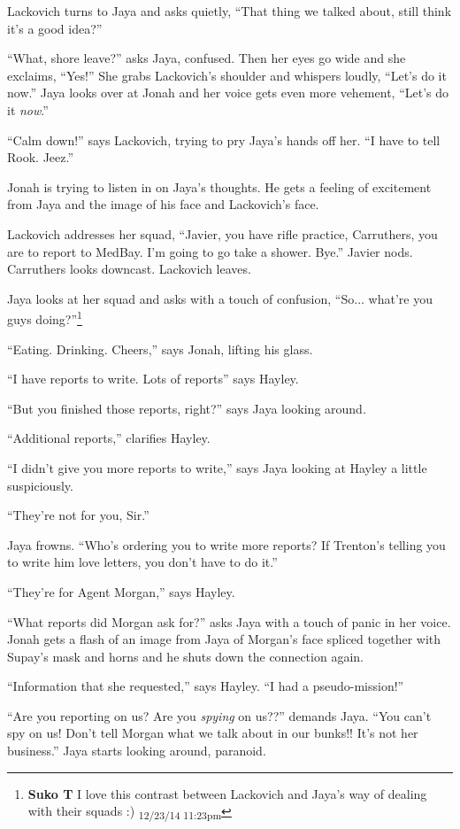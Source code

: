 Lackovich turns to Jaya and asks quietly, ``That thing we talked about, still think it's a good idea?''

``What, shore leave?'' asks Jaya, confused.  Then her eyes go wide and she exclaims, ``Yes!''  She grabs Lackovich's shoulder and whispers loudly, ``Let's do it now.''  Jaya looks over at Jonah and her voice gets even more vehement, ``Let's do it \textit{now}.''

``Calm down!'' says Lackovich, trying to pry Jaya's hands off her.  ``I have to tell Rook.  Jeez.''

Jonah is trying to listen in on Jaya's thoughts.  He gets a feeling of excitement from Jaya and the image of his face and Lackovich's face.

Lackovich addresses her squad, ``Javier, you have rifle practice, Carruthers, you are to report to MedBay.  I'm going to go take a shower.  Bye.''  Javier nods.  Carruthers looks downcast.  Lackovich leaves.

Jaya looks at her squad and asks with a touch of confusion, ``So... what're you guys doing?''\footnote{\textbf{Suko T }I love this contrast between Lackovich and Jaya's way of dealing with their squads :) \textsubscript{12/23/14 11:23pm}}

``Eating.  Drinking.  Cheers,'' says Jonah, lifting his glass.

``I have reports to write.  Lots of reports'' says Hayley.

``But you finished those reports, right?'' says Jaya looking around.

``Additional reports,'' clarifies Hayley.

``I didn't give you more reports to write,'' says Jaya looking at Hayley a little suspiciously.

``They're not for you, Sir.''

Jaya frowns.  ``Who's ordering you to write more reports?  If Trenton's telling you to write him love letters, you don't have to do it.''

``They're for Agent Morgan,'' says Hayley.

``What reports did Morgan ask for?'' asks Jaya with a touch of panic in her voice. Jonah gets a flash of an image from Jaya of Morgan's face spliced together with Supay's mask and horns and he shuts down the connection again.

``Information that she requested,'' says Hayley.  ``I had a pseudo-mission!''

``Are you reporting on us?  Are you \textit{spying} on us??'' demands Jaya.  ``You can't spy on us!  Don't tell Morgan what we talk about in our bunks!!  It's not her business.''  Jaya starts looking around, paranoid.

